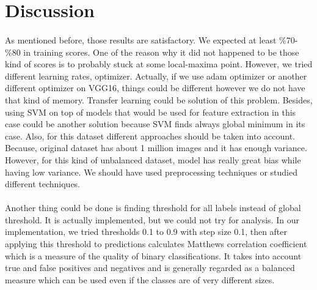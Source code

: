 \section{Discussion}
\paragraph{}As mentioned before, those results are satisfactory. We expected at least \%70-\%80 in training scores. One of the reason why it did not happened to be those kind of scores is to probably stuck at some local-maxima point. However, we tried different learning rates, optimizer. Actually, if we use adam optimizer or another different optimizer on VGG16, things could be different however we do not have that kind of memory. Transfer learning could be solution of this problem. Besides, using SVM on top of models that would be used for feature extraction in this case could be another solution because SVM finds always global minimum in its case. Also, for this dataset different approaches should be taken into account. Because, original dataset has about 1 million images and it has enough variance. However, for this kind of unbalanced dataset, model has really great bias while having low variance. We should have used preprocessing techniques or studied different techniques.  
\paragraph{}Another thing could be done is finding threshold for all labels instead of global threshold. It is actually implemented, but we could not try for analysis. In our implementation, we tried thresholds 0.1 to 0.9 with step size 0.1, then after applying this threshold to predictions calculates Matthews correlation coefficient which is a measure of the quality of binary classifications.\cite{matcof} It takes into account true and false positives and negatives and is generally regarded as a balanced measure which can be used even if the classes are of very different sizes. 

